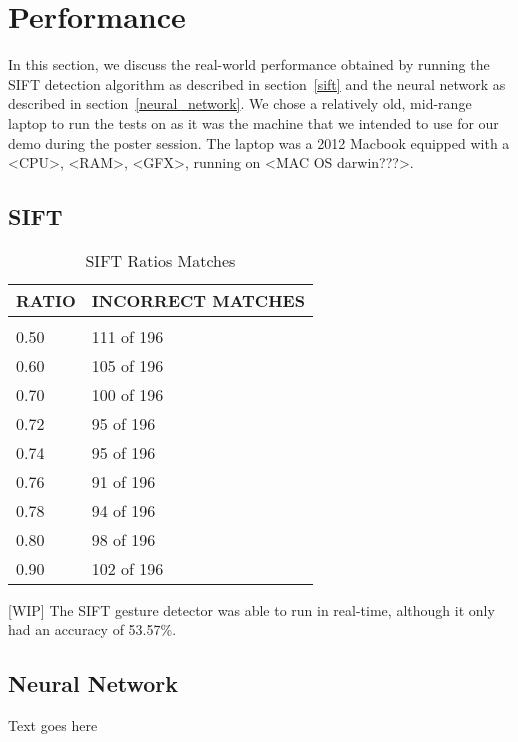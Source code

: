 \section{Performance}
\label{performance}

In this section, we discuss the real-world performance obtained by running the SIFT detection algorithm as described in section~\ref{sift} and the neural network as described in section~\ref{neural_network}. We chose a relatively old, mid-range laptop to run the tests on as it was the machine that we intended to use for our demo during the poster session. The laptop was a 2012 Macbook equipped with a <CPU>, <RAM>, <GFX>, running on <MAC OS darwin???>.

\subsection{SIFT}

\begin{table}[t]
\caption{SIFT Ratios Matches}
\label{sift_ratios}
\begin{center}
\begin{tabular}{ll}
\multicolumn{1}{c}{\bf RATIO}  &\multicolumn{1}{c}{\bf INCORRECT MATCHES}
\\ \hline \\
0.50             &111 of 196 \\
0.60             &105 of 196 \\
0.70             &100 of 196 \\
0.72             &95 of 196 \\
0.74             &95 of 196 \\
0.76             &91 of 196 \\
0.78             &94 of 196 \\
0.80             &98 of 196 \\
0.90             &102 of 196 \\
\end{tabular}
\end{center}
\end{table}

[WIP] The SIFT gesture detector was able to run in real-time, although it only had an accuracy of 53.57\%.

\subsection{Neural Network}

Text goes here